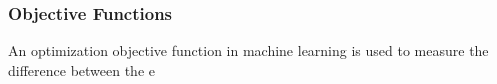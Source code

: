 \subsubsection{Objective Functions}
An optimization objective function in machine learning is used to measure the difference between the e